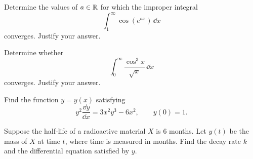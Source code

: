 \begin{problem}
\begin{problemsubparts}
\item Determine the values of $a\in\mathbb{R}$ for which the improper integral
\[
\int_1^\infty \cos(e^{ax})\,\dd x
\]
converges. Justify your answer.
\item Determine whether
\[
\int_0^\infty\frac{\cos^3 x}{\sqrt{x}}\,\dd x
\]
converges. Justify your answer.
\end{problemsubparts}
\end{problem}

\begin{problem}
\begin{problemsubparts}
\item Find the function $y=y(x)$ satisfying
\[
y^2\frac{\dd y}{\dd x}=3x^2y^3-6x^2,
\qquad
y(0)=1.
\]
\item Suppose the half-life of a radioactive material $X$ is $6$ months. Let $y(t)$ be the mass of $X$ at time $t$, where time is measured in months. Find the decay rate $k$ and the differential equation satisfied by $y$.
\end{problemsubparts}
\end{problem}


